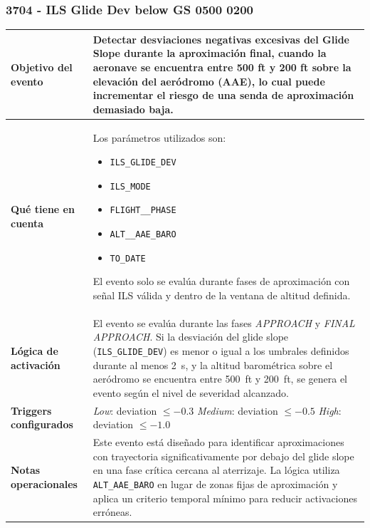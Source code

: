 \documentclass[11pt,a4paper]{article}
\begin{document}
	\subsubsection{3704 - ILS Glide Dev below GS 0500 0200}
	\begin{longtable}{p{5cm} p{9.5cm}}
		\hline
		\textbf{Objetivo del evento} &
		Detectar desviaciones negativas excesivas del Glide Slope durante la aproximación final, cuando la aeronave se encuentra entre 500 ft y 200 ft sobre la elevación del aeródromo (AAE), lo cual puede incrementar el riesgo de una senda de aproximación demasiado baja. \\
		\hline
		\textbf{Qué tiene en cuenta} &
		Los parámetros utilizados son:
		\begin{itemize}
			\item \texttt{ILS\_GLIDE\_DEV}
			\item \texttt{ILS\_MODE}
			\item \texttt{FLIGHT\_\_PHASE}
			\item \texttt{ALT\_\_AAE\_BARO}
			\item \texttt{TO\_DATE}
		\end{itemize}
		El evento solo se evalúa durante fases de aproximación con señal ILS válida y dentro de la ventana de altitud definida. \\
		\hline
		\textbf{Lógica de activación} &
		El evento se evalúa durante las fases \textit{APPROACH} y \textit{FINAL APPROACH}.  
		Si la desviación del glide slope (\texttt{ILS\_GLIDE\_DEV}) es menor o igual a los umbrales definidos durante al menos \SI{2}{s}, y la altitud barométrica sobre el aeródromo se encuentra entre \SI{500}{ft} y \SI{200}{ft}, se genera el evento según el nivel de severidad alcanzado. \\
		\hline
		\textbf{Triggers configurados} &
		\textit{Low}: deviation $\leq -0.3$ \newline
		\textit{Medium}: deviation $\leq -0.5$ \newline
		\textit{High}: deviation $\leq -1.0$ \\
		\hline
		\textbf{Notas operacionales} &
		Este evento está diseñado para identificar aproximaciones con trayectoria significativamente por debajo del glide slope en una fase crítica cercana al aterrizaje.  
		La lógica utiliza \texttt{ALT\_AAE\_BARO} en lugar de zonas fijas de aproximación y aplica un criterio temporal mínimo para reducir activaciones erróneas. \\
		\hline
	\end{longtable} \newpage
	
\end{document}
